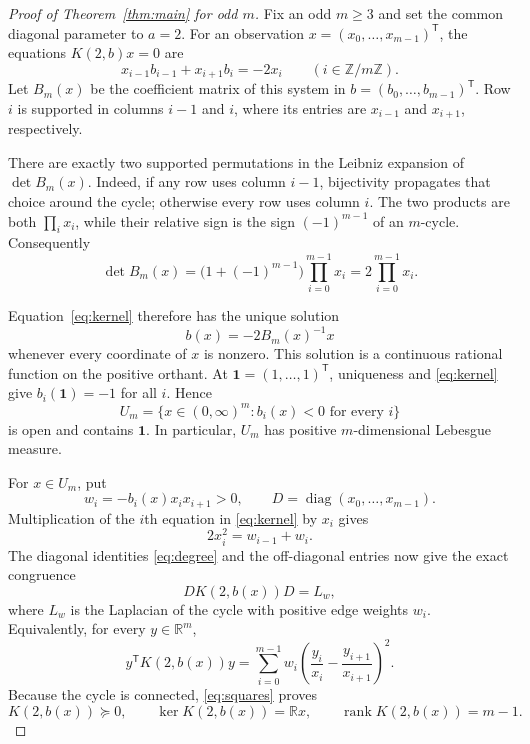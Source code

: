 \documentclass[11pt]{article}
\newcommand{\R}{\mathbb{R}}
\begin{document}
\begin{proof}[Proof of Theorem~\ref{thm:main} for odd $m$]
Fix an odd $m\geq3$ and set the common diagonal parameter to $a=2$.  For an
observation $x=(x_0,\ldots,x_{m-1})^{\mathsf T}$, the equations
$K(2,b)x=0$ are
\begin{equation}\label{eq:kernel}
 x_{i-1}b_{i-1}+x_{i+1}b_i=-2x_i
 \qquad (i\in\mathbb Z/m\mathbb Z).
\end{equation}
Let $B_m(x)$ be the coefficient matrix of this system in
$b=(b_0,\ldots,b_{m-1})^{\mathsf T}$.  Row $i$ is supported in columns
$i-1$ and $i$, where its entries are $x_{i-1}$ and $x_{i+1}$, respectively.

There are exactly two supported permutations in the Leibniz expansion of
$\det B_m(x)$.  Indeed, if any row uses column $i-1$, bijectivity propagates
that choice around the cycle; otherwise every row uses column $i$.  The two
products are both $\prod_i x_i$, while their relative sign is the sign
$(-1)^{m-1}$ of an $m$-cycle.  Consequently
\begin{equation}\label{eq:determinant}
 \det B_m(x)=\bigl(1+(-1)^{m-1}\bigr)\prod_{i=0}^{m-1}x_i
             =2\prod_{i=0}^{m-1}x_i.
\end{equation}

Equation~\eqref{eq:kernel} therefore has the unique solution
\[
 b(x)=-2B_m(x)^{-1}x
\]
whenever every coordinate of $x$ is nonzero.  This solution is a continuous
rational function on the positive orthant.  At
$\mathbf 1=(1,\ldots,1)^{\mathsf T}$, uniqueness and
\eqref{eq:kernel} give $b_i(\mathbf1)=-1$ for all $i$.  Hence
\begin{equation}\label{eq:open-set}
 U_m=\{x\in(0,\infty)^m:b_i(x)<0\text{ for every }i\}
\end{equation}
is open and contains $\mathbf1$.  In particular, $U_m$ has positive
$m$-dimensional Lebesgue measure.

For $x\in U_m$, put
\[
 w_i=-b_i(x)x_ix_{i+1}>0,
 \qquad D=\operatorname{diag}(x_0,\ldots,x_{m-1}).
\]
Multiplication of the $i$th equation in \eqref{eq:kernel} by $x_i$ gives
\begin{equation}\label{eq:degree}
 2x_i^2=w_{i-1}+w_i.
\end{equation}
The diagonal identities \eqref{eq:degree} and the off-diagonal entries now
give the exact congruence
\begin{equation}\label{eq:congruence}
 DK(2,b(x))D=L_w,
\end{equation}
where $L_w$ is the Laplacian of the cycle with positive edge weights $w_i$.
Equivalently, for every $y\in\R^m$,
\begin{equation}\label{eq:squares}
 y^{\mathsf T}K(2,b(x))y
 =\sum_{i=0}^{m-1}w_i
 \left(\frac{y_i}{x_i}-\frac{y_{i+1}}{x_{i+1}}\right)^2.
\end{equation}
Because the cycle is connected, \eqref{eq:squares} proves
\[
 K(2,b(x))\succeq0,\qquad
 \ker K(2,b(x))=\R x,\qquad
 \operatorname{rank}K(2,b(x))=m-1.
\]


\end{proof}
\end{document}
